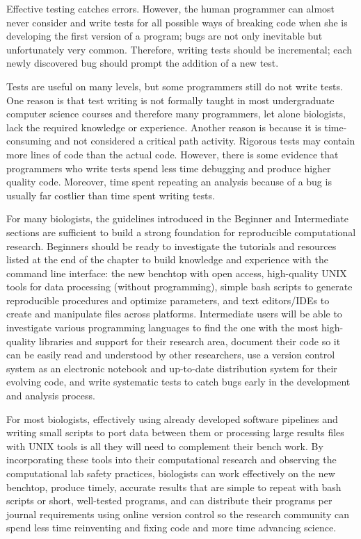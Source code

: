 \documentclass[ChapterTOCs,krantz2]{krantz} %
\begin{document}
Effective testing catches errors. However, the human programmer can almost
never consider and write tests for all possible ways of breaking code when
she is developing the first version of a program; bugs are not only inevitable
but unfortunately very common.
Therefore, writing tests should be incremental; each newly discovered bug
should prompt the addition of a new test.

Tests are useful on many levels, but some programmers still do not
write tests\cite{Wilson2006}.  One reason is that test writing is not formally taught in most
undergraduate computer science courses and therefore many programmers, let
alone biologists, lack the required knowledge or experience.  Another reason is
because it is time-consuming and not considered a critical path activity\cite{Segal2007,Kelly2008}.
Rigorous tests may contain more lines of code than the actual code. 
However, there is some evidence that
programmers who write tests 
spend less time debugging and produce higher quality code.
Moreover, time spent repeating an analysis because of a bug is usually far
costlier than time spent writing tests.

For many biologists, the guidelines introduced in the Beginner and Intermediate
sections are sufficient to build a strong foundation for reproducible
computational research.  Beginners should be ready to investigate the tutorials
and resources listed at the end of the chapter to build knowledge and
experience with the command line interface: the new benchtop with open access,
high-quality UNIX tools for data processing (without programming), simple bash
scripts to generate reproducible procedures and optimize parameters, and text
editors/IDEs to create and manipulate files across platforms.  Intermediate
users
will be able to investigate various programming languages to find the one with
the most high-quality libraries and support for their research area, document
their code so it can be easily read and understood by other researchers, use a
version control system as an electronic notebook and up-to-date distribution
system for their evolving code, and write systematic tests to catch bugs early
in the development and analysis process. 

For most biologists, effectively using already developed software pipelines and writing
small scripts to port data between them or processing large results files with
UNIX tools is all they will need to complement their bench work.  By
incorporating these tools into their computational research and observing the
computational lab safety practices, biologists can work
effectively on the new benchtop, produce timely, accurate results that are
simple to repeat with bash scripts or short, well-tested programs, and can
distribute their programs per journal requirements using online version control
so the research community can spend less time reinventing and fixing code and
more time advancing science. 
\end{document}

